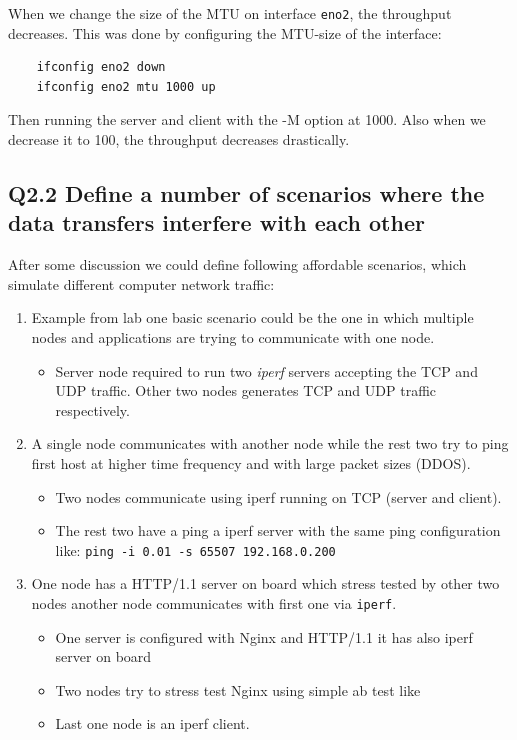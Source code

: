 \documentclass{article}
\begin{document}
When we change the size of the MTU on interface \texttt{eno2}, the throughput decreases. This was done by configuring the MTU-size of the interface:
\begin{verbatim}
    ifconfig eno2 down
    ifconfig eno2 mtu 1000 up
\end{verbatim}

Then running the server and client with the -M option at 1000. Also when we decrease it to 100, the throughput decreases drastically.

\bigskip

\subsection{Q2.2 Define a number of scenarios where the data transfers interfere with each other}
After some discussion we could define following affordable scenarios, which simulate different computer network traffic:

\begin{enumerate}
    \item Example from lab one basic scenario could be the one in which multiple nodes and applications are trying to  communicate  with  one  node.
        \begin{itemize}
            \item Server node required to run two \textit{iperf} servers accepting the TCP and UDP traffic. Other two nodes generates TCP and UDP traffic respectively.
        \end{itemize}
    \item A single node communicates with another node while the rest two try to ping first host at higher time frequency and with large packet sizes (DDOS).
        \begin{itemize}
            \item Two nodes communicate using iperf running on TCP (server and client).
            \item The rest two have a ping a iperf server with the same ping configuration like: \texttt{ping -i 0.01 -s 65507 192.168.0.200}
        \end{itemize}    
    \item One node has a HTTP/1.1 server on board which stress tested by other two nodes another node communicates with first one via \texttt{iperf}.
    \begin{itemize}
        \item One server is configured with Nginx and HTTP/1.1 it has also iperf server on board
        \item Two nodes try to stress test Nginx using simple ab test like 
        \item Last one node is an iperf client.
    \end{itemize}
\end{enumerate}
\end{document}
